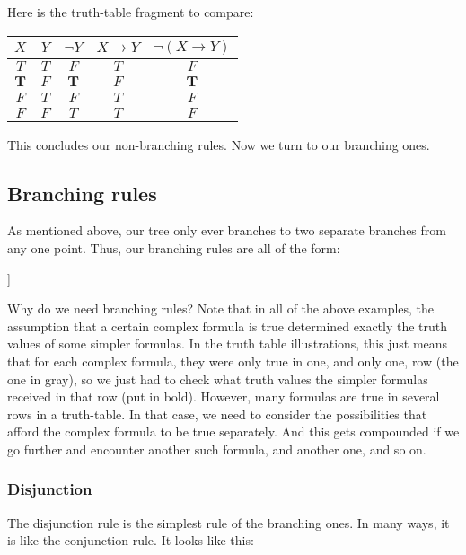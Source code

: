 Here is the truth-table fragment to compare:

\begin{center}
	\begin{tabular}{c|c|c|c|c}
	$X$ & $Y$ & $\neg Y$ & $X \rightarrow Y$ & $\neg (X \rightarrow Y)$\\ \hline
	$T$ & $T$ & $F$& $T$& $F$ \\\rowcolor{lightgray}
	$\mathbf{T}$ & $F$ & $\mathbf{T}$& $F$& $\mathbf{T}$ \\
	$F$ & $T$ & $F$& $T$& $F$\\
	$F$ & $F$ & $T$ & $T$ & $F$
	\end{tabular}
\end{center}

This concludes our non-branching rules. Now we turn to our branching ones. 

\subsection{Branching rules}

As mentioned above, our tree only ever branches to two separate branches from any one point. Thus, our branching rules are all of the form:

\begin{center}
\begin{forest}
	[$X$
		[$Y$]
		[$Z$]
	]
\end{forest}
\end{center}

Why do we need branching rules? Note that in all of the above examples, the assumption that a certain complex formula is true determined exactly the truth values of some simpler formulas. In the truth table illustrations, this just means that for each complex formula, they were only true in one, and only one, row (the one in gray), so we just had to check what truth values the simpler formulas received in that row (put in bold). However, many formulas are true in several rows in a truth-table. In that case, we need to consider the possibilities that afford the complex formula to be true separately. And this gets compounded if we go further and encounter another such formula, and another one, and so on. 

\subsubsection{Disjunction}

The disjunction rule is the simplest rule of the branching ones. In many ways, it is like the conjunction rule. It looks like this:

